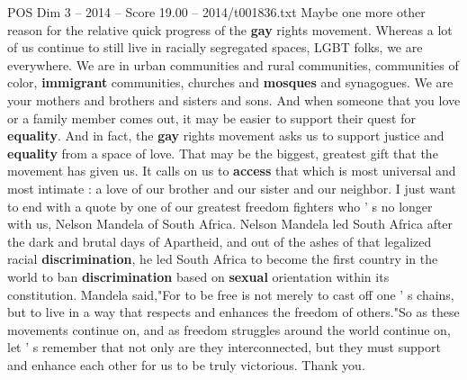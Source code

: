 \begin{textsample}{POS Dim 3 – 2014 – Score 19.00 – 2014/t001836.txt}
Maybe one more other reason for the relative quick progress of the \textbf{gay} rights movement.
Whereas a lot of us continue to still live in racially segregated spaces, LGBT folks, we are everywhere.
We are in urban communities and rural communities, communities of color, \textbf{immigrant} communities, churches and \textbf{mosques} and synagogues.
We are your mothers and brothers and sisters and sons.
And when someone that you love or a family member comes out, it may be easier to support their quest for \textbf{equality}.
And in fact, the \textbf{gay} rights movement asks us to support justice and \textbf{equality} from a space of love.
That may be the biggest, greatest gift that the movement has given us.
It calls on us to \textbf{access} that which is most universal and most intimate : a love of our brother and our sister and our neighbor.
I just want to end with a quote by one of our greatest freedom fighters who ' s no longer with us, Nelson Mandela of South Africa.
Nelson Mandela led South Africa after the dark and brutal days of Apartheid, and out of the ashes of that legalized racial \textbf{discrimination}, he led South Africa to become the first country in the world to ban \textbf{discrimination} based on \textbf{sexual} orientation within its constitution.
Mandela said,"For to be free is not merely to cast off one ' s chains, but to live in a way that respects and enhances the freedom of others."So as these movements continue on, and as freedom struggles around the world continue on, let ' s remember that not only are they interconnected, but they must support and enhance each other for us to be truly victorious.
Thank you.

\end{textsample}
